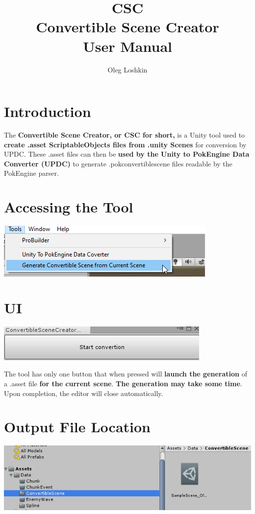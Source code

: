 \documentclass[10pt,a4paper]{article}
\author{Oleg Loshkin}
\title{\textbf{CSC}\\Convertible Scene Creator\\\textbf{User Manual}}
\begin{document}
\maketitle

\section{Introduction}
The \textbf{Convertible Scene Creator, or CSC for short,} is a Unity tool used to \textbf{create .asset ScriptableObjects files from .unity Scenes} for conversion by UPDC.
These .asset files can then be \textbf{used by the Unity to PokEngine Data Converter (UPDC)} to generate .pokconvertiblescene files readable by the PokEngine parser.

\section{Accessing the Tool}
\begin{center}
\includegraphics[scale=1.0]{mainMenu}
\end{center}

\section{UI}
\begin{center}
\includegraphics[scale=1.0]{editorUi}
\end{center}
The tool has only one button that when pressed will \textbf{launch the generation} of a .asset file \textbf{for the current scene}. \textbf{The generation may take some time}. Upon completion, the editor will close automatically.

\section{Output File Location}
\begin{center}
\includegraphics[scale=0.75]{outputFile}
\end{center}
\newpage
\end{document}
